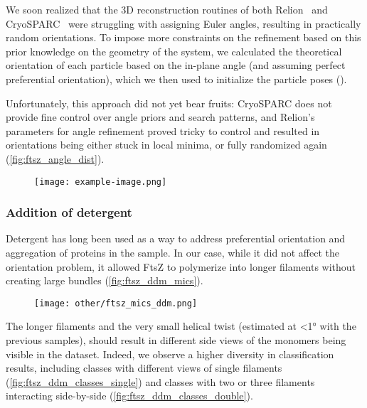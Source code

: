 We soon realized that the 3D reconstruction routines of both Relion~\cite{scheresRELIONImplementationBayesian2012} and CryoSPARC~\cite{punjaniCryoSPARCAlgorithmsRapid2017} were struggling with assigning Euler angles, resulting in practically random orientations.
To impose more constraints on the refinement based on this prior knowledge on the geometry of the system, we calculated the theoretical orientation of each particle based on the in-plane angle (and assuming perfect preferential orientation), which we then used to initialize the particle poses ().

Unfortunately, this approach did not yet bear fruits: CryoSPARC does not provide fine control over angle priors and search patterns, and Relion's parameters for angle refinement proved tricky to control and resulted in orientations being either stuck in local minima, or fully randomized again (\autoref{fig:ftsz_angle_dist}).

\begin{figure}[ht]
    \centering
    \texttt{[image: example-image.png]}
    \label{fig:ftsz_angle_dist}
\end{figure}

\subsubsection{Addition of detergent}
Detergent has long been used as a way to address preferential orientation and aggregation of proteins in the sample.
In our case, while it did not affect the orientation problem, it allowed FtsZ to polymerize into longer filaments without creating large bundles (\autoref{fig:ftsz_ddm_mics}).

\begin{figure}[ht]
    \centering
    \texttt{[image: other/ftsz\_mics\_ddm.png]}
    \label{fig:ftsz_ddm_mics}
\end{figure}

The longer filaments and the very small helical twist (estimated at <1° with the previous samples), should result in different side views of the monomers being visible in the dataset.
Indeed, we observe a higher diversity in classification results, including classes with different views of single filaments (\autoref{fig:ftsz_ddm_classes_single}) and classes with two or three filaments interacting side-by-side (\autoref{fig:ftsz_ddm_classes_double}).

